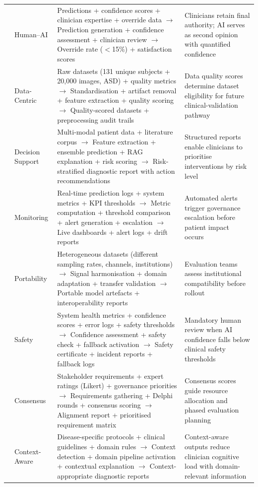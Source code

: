 \begin{table}[!htbp]
\begin{tabularx}{\textwidth}{@{} p{0.4cm} p{1.5cm} L L @{}}
 & Human--AI & Predictions + confidence scores + clinician expertise + override data $\to$ Prediction generation + confidence assessment + clinician review $\to$ Override rate ($<$15\%) + satisfaction scores & Clinicians retain final authority; AI serves as second opinion with quantified confidence \\
 & Data-Centric & Raw datasets (131 unique subjects + 20{,}000 images, ASD) + quality metrics $\to$ Standardisation + artifact removal + feature extraction + quality scoring $\to$ Quality-scored datasets + preprocessing audit trails & Data quality scores determine dataset eligibility for future clinical-validation pathway \\
 & Decision Support & Multi-modal patient data + literature corpus $\to$ Feature extraction + ensemble prediction + RAG explanation + risk scoring $\to$ Risk-stratified diagnostic report with action recommendations & Structured reports enable clinicians to prioritise interventions by risk level \\
 & Monitoring & Real-time prediction logs + system metrics + KPI thresholds $\to$ Metric computation + threshold comparison + alert generation + escalation $\to$ Live dashboards + alert logs + drift reports & Automated alerts trigger governance escalation before patient impact occurs \\
 & Portability & Heterogeneous datasets (different sampling rates, channels, institutions) $\to$ Signal harmonisation + domain adaptation + transfer validation $\to$ Portable model artefacts + interoperability reports & Evaluation teams assess institutional compatibility before rollout \\
 & Safety & System health metrics + confidence scores + error logs + safety thresholds $\to$ Confidence assessment + safety check + fallback activation $\to$ Safety certificate + incident reports + fallback logs & Mandatory human review when AI confidence falls below clinical safety thresholds \\
 & Consensus & Stakeholder requirements + expert ratings (Likert) + governance priorities $\to$ Requirements gathering + Delphi rounds + consensus scoring $\to$ Alignment report + prioritised requirement matrix & Consensus scores guide resource allocation and phased evaluation planning \\
 & Context-Aware & Disease-specific protocols + clinical guidelines + domain rules $\to$ Context detection + domain pipeline activation + contextual explanation $\to$ Context-appropriate diagnostic reports & Context-aware outputs reduce clinician cognitive load with domain-relevant information \\

\end{tabularx}
\end{table}
